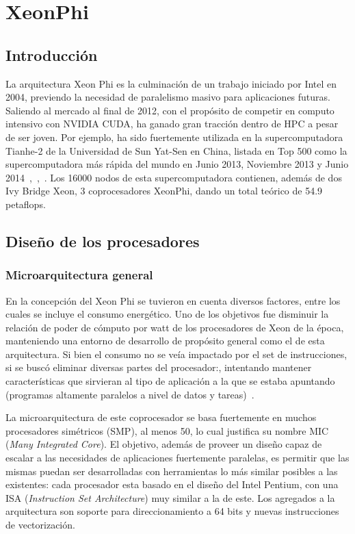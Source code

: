 
\section{XeonPhi}

\subsection{Introducci\'on}

La arquitectura Xeon Phi es la culminaci\'on de un trabajo iniciado por Intel en 2004, previendo
la necesidad de paralelismo masivo para aplicaciones futuras. Saliendo al mercado al final de 2012,
con el prop\'osito de competir en computo intensivo con NVIDIA CUDA, ha ganado gran tracci\'on dentro
de HPC a pesar de ser joven. Por ejemplo, ha sido fuertemente utilizada en la supercomputadora Tianhe-2 
de la Universidad de Sun Yat-Sen en China, listada en Top 500 como la supercomputadora m\'as r\'apida del
mundo en Junio 2013, Noviembre 2013 y Junio 2014~\cite{Top500XeonPhiJune2013},~\cite{Top500XeonPhiNov2013},~\cite{Top500XeonPhiJune2014}. 
Los 16000 nodos de esta supercomputadora contienen, adem\'as de dos Ivy Bridge Xeon, 3 coprocesadores
XeonPhi, dando un total te\'orico de 54.9 petaflops.

\subsection{Dise\~no de los procesadores}

\subsubsection{Microarquitectura general} 

En la concepci\'on del Xeon Phi se tuvieron en cuenta diversos factores, entre los cuales
se incluye el consumo energ\'etico. Uno de los objetivos fue disminuir la relaci\'on de
poder de c\'omputo por watt de los procesadores de Xeon de la \'epoca, manteniendo una entorno
de desarrollo de prop\'osito general como el de esta arquitectura. 
Si bien el consumo no se ve\'ia impactado por el set de instrucciones, 
si se busc\'o eliminar diversas partes del procesador:, intentando mantener 
caracter\'isticas que sirvieran al tipo de aplicaci\'on a la que se estaba 
apuntando (programas altamente paralelos a nivel de datos y tareas)~\cite{BookXeonPhi}.

La microarquitectura de este coprocesador se basa fuertemente en muchos procesadores sim\'etricos (SMP), al menos 50, lo
cual justifica su nombre MIC (\textit{Many Integrated Core}). El objetivo, adem\'as de proveer un dise\~no
capaz de escalar a las necesidades de aplicaciones fuertemente paralelas, es permitir que las mismas puedan
ser desarrolladas con herramientas lo m\'as similar posibles a las existentes: cada procesador esta basado
en el dise\~no del Intel Pentium, con una ISA (\textit{Instruction Set Architecture}) muy similar a la de este.
Los agregados a la arquitectura son soporte para direccionamiento a 64 bits y nuevas instrucciones de vectorizaci\'on.

